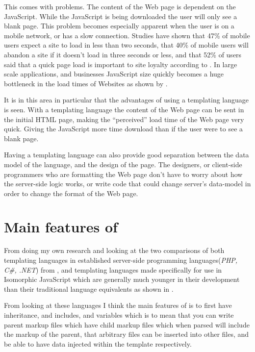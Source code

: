 This comes with problems. The content of the Web page is dependent on the JavaScript. While the JavaScript is being downloaded the user will only see a blank page. This problem becomes especially apparent when the user is on a mobile network, or has a slow connection. Studies have shown that 47\% of mobile users expect a site to load in less than two seconds, that 40\% of mobile users will abandon a site if it doesn't load in three seconds or less, and that 52\% of users said that a quick page load is important to site loyalty according to \parencite{MobileLoad}. In large scale applications, and businesses JavaScript size quickly becomes a huge bottleneck in the load times of Websites as shown by \parencite{VergeJS}.\newline

It is in this area in particular that the advantages of using a templating language is seen. With a templating language the content of the Web page can be sent in the initial HTML page, making the ``perceived'' load time of the Web page very quick. Giving the JavaScript more time download than if the user were to see a blank page.\newline

Having a templating language can also provide good separation between the data model of the language, and the design of the page. The designers, or client-side programmers who are formatting the Web page don't have to worry about how the server-side logic works, or write code that could change server's data-model in order to change the format of the Web page. 
\newpage
\section{Main features of \languageName{}}
From doing my own research and looking at the two comparisons of both templating languages in established server-side programming languages(\textit{PHP, C\#, .NET}) from \parencite{WikiCompare}, and templating languages made specifically for use in Isomorphic JavaScript which are generally much younger in their development than their traditional language equivalents as shown in \parencite{JSCompare}.

From looking at these languages I think the main features of \languageName{} is to first have inheritance, and includes, and variables which is to mean that you can write parent markup files which have child markup files which when parsed will include the markup of the parent, that arbitrary \languageName{} files can be inserted into other \languageName{} files, and be able to have data injected within the template respectively. 

